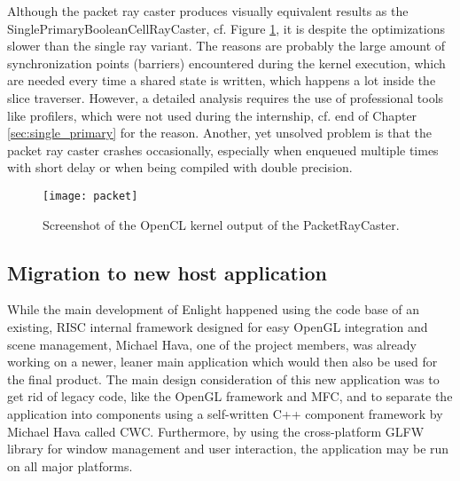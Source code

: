 Although the packet ray caster produces visually equivalent results as the SinglePrimaryBooleanCellRayCaster, cf. Figure \ref{fig:packet}, it is despite the optimizations slower than the single ray variant. The reasons are probably the large amount of synchronization points (barriers) encountered during the kernel execution, which are needed every time a shared state is written, which happens a lot inside the slice traverser. However, a detailed analysis requires the use of professional tools like profilers, which were not used during the internship, cf. end of Chapter \ref{sec:single_primary} for the reason. Another, yet unsolved problem is that the packet ray caster crashes occasionally, especially when enqueued multiple times with short delay or when being compiled with double precision. 


\begin{figure}
\centering
\texttt{[image: packet]}
\caption{Screenshot of the OpenCL kernel output of the PacketRayCaster.}
\label{fig:packet}
\end{figure}

\subsection{Migration to new host application}
\label{sec:migration}

While the main development of Enlight happened using the code base of an existing, RISC internal framework designed for easy OpenGL integration and scene management, Michael Hava, one of the project members, was already working on a newer, leaner main application which would then also be used for the final product. The main design consideration of this new application was to get rid of legacy code, like the OpenGL framework and MFC, and to separate the application into components using a self-written C++ component framework by Michael Hava called CWC. Furthermore, by using the cross-platform GLFW library for window management and user interaction, the application may be run on all major platforms.


